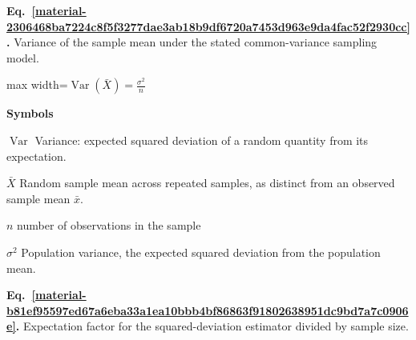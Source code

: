 \documentclass[11pt,a4paper]{article}
\begin{document}
\par\medskip
\noindent\begin{minipage}{\linewidth}
\label{material-2306468ba7224c8f5f3277dae3ab18b9df6720a7453d963e9da4fac52f2930cc}
\noindent\textbf{Eq.~\ref*{material-2306468ba7224c8f5f3277dae3ab18b9df6720a7453d963e9da4fac52f2930cc}.} Variance of the sample mean under the stated common-variance sampling model.\par\nopagebreak
\begin{center}\begin{adjustbox}{max width=\linewidth}$\displaystyle \boxed{\operatorname{Var}(\bar X)=\frac{\sigma^2}{n}}$\end{adjustbox}\end{center}

\par\noindent\textbf{Symbols}

\par\noindent\textbf{\(\operatorname{Var}\)} Variance: expected squared deviation of a random quantity from its expectation.

\par\noindent\textbf{\(\bar X\)} Random sample mean across repeated samples, as distinct from an observed sample mean \ensuremath{\bar{x}}.

\par\noindent\textbf{\(n\)} number of observations in the sample

\par\noindent\textbf{\(\sigma^2\)} Population variance, the expected squared deviation from the population mean.

\end{minipage}\par
\medskip

\par\medskip
{}
\label{material-b81ef95597ed67a6eba33a1ea10bbb4bf86863f91802638951dc9bd7a7c0906e}
\noindent\textbf{Eq.~\ref*{material-b81ef95597ed67a6eba33a1ea10bbb4bf86863f91802638951dc9bd7a7c0906e}.} Expectation factor for the squared-deviation estimator divided by sample size.\par\nopagebreak
\end{document}
